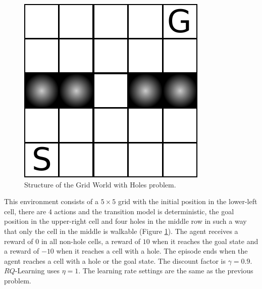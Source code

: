 \begin{figure}[t]
\centering
\includegraphics[scale=.55]{./img/gridhole.pdf}
\caption[Structure of the Grid World with Holes problem.]{Structure of the Grid World with Holes problem.}
  \label{F:grid_hole_map}
\end{figure}
This environment consists of a $5 \times 5$ grid with the initial position in the lower-left cell, there are $4$ actions and the transition model is deterministic, the goal position in the upper-right cell and four holes in the middle row in such a way that only the cell in the middle is walkable (Figure \ref{F:grid_hole_map}). The agent receives a reward of $0$ in all non-hole cells, a reward of $10$ when it reaches the goal state and a reward of $-10$ when it reaches a cell with a hole. The episode ends when the agent reaches a cell with a hole or the goal state. The discount factor is $\gamma = 0.9$. $RQ$-Learning uses $\eta = 1$.
The learning rate settings are the same as the previous problem.

